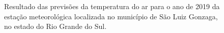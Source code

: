\begin{figure}[H]%
\caption{Resultado das previsões da temperatura do ar para o ano de 2019 da estação meteorológica localizada no município de São Luiz Gonzaga, no estado do Rio Grande do Sul.}
\centering
{}
\qquad
{}
\label{fig:results_lstm_83361}%
\end{figure}

\renewcommand{\cleardoublepage}{}
\renewcommand{\clearpage}{}
\vspace{5mm}